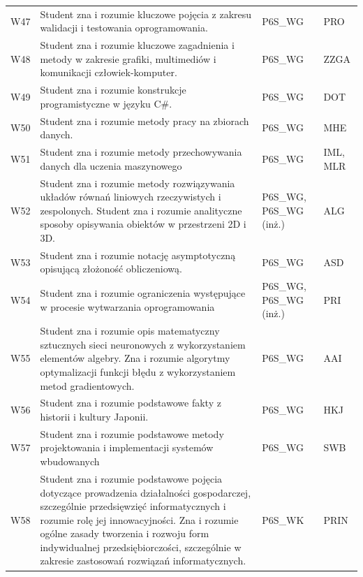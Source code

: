 \documentclass[12pt,a4paper]{article}
\begin{document}
{\begin{longtable}{m{1cm}m{8.8cm}m{2.1cm}m{2.5cm}}
\rowcolor{tableRowLight} W47 & Student zna i rozumie kluczowe pojęcia z zakresu walidacji i testowania oprogramowania. & {\scriptsize P6S\_WG} & {\scriptsize PRO} \\
\rowcolor{tableRowAlt} W48 & Student zna i rozumie kluczowe zagadnienia i metody w zakresie grafiki, multimediów i komunikacji człowiek-komputer. & {\scriptsize P6S\_WG} & {\scriptsize ZZGA} \\
\rowcolor{tableRowLight} W49 & Student zna i rozumie konstrukcje programistyczne w języku C\#. & {\scriptsize P6S\_WG} & {\scriptsize DOT} \\
\rowcolor{tableRowAlt} W50 & Student zna i rozumie metody pracy na zbiorach danych. & {\scriptsize P6S\_WG} & {\scriptsize MHE} \\
\rowcolor{tableRowLight} W51 & Student zna i rozumie metody przechowywania danych dla uczenia maszynowego & {\scriptsize P6S\_WG} & {\scriptsize IML, MLR} \\
\rowcolor{tableRowAlt} W52 & Student zna i rozumie metody rozwiązywania układów równań liniowych rzeczywistych i zespolonych. Student zna i rozumie analityczne sposoby opisywania obiektów w przestrzeni 2D i 3D. & {\scriptsize P6S\_WG, P6S\_WG {\scriptsize (inż.)}} & {\scriptsize ALG} \\
\rowcolor{tableRowLight} W53 & Student zna i rozumie notację asymptotyczną opisującą złożoność obliczeniową. & {\scriptsize P6S\_WG} & {\scriptsize ASD} \\
\rowcolor{tableRowAlt} W54 & Student zna i rozumie ograniczenia występujące w procesie wytwarzania oprogramowania & {\scriptsize P6S\_WG, P6S\_WG {\scriptsize (inż.)}} & {\scriptsize PRI} \\
\rowcolor{tableRowLight} W55 & Student zna i rozumie opis matematyczny sztucznych sieci neuronowych z wykorzystaniem elementów algebry. Zna i rozumie algorytmy optymalizacji funkcji błędu z wykorzystaniem metod gradientowych. & {\scriptsize P6S\_WG} & {\scriptsize AAI} \\
\rowcolor{tableRowAlt} W56 & Student zna i rozumie podstawowe fakty z historii i kultury Japonii. & {\scriptsize P6S\_WG} & {\scriptsize HKJ} \\
\rowcolor{tableRowLight} W57 & Student zna i rozumie podstawowe metody projektowania i implementacji systemów wbudowanych & {\scriptsize P6S\_WG} & {\scriptsize SWB} \\
\rowcolor{tableRowAlt} W58 & Student zna i rozumie podstawowe pojęcia dotyczące prowadzenia działalności gospodarczej, szczególnie przedsięwzięć informatycznych i rozumie rolę jej innowacyjności. Zna i rozumie ogólne zasady tworzenia i rozwoju form indywidualnej przedsiębiorczości, szczególnie w zakresie zastosowań rozwiązań informatycznych. & {\scriptsize P6S\_WK} & {\scriptsize PRIN} \\

\end{longtable}}
\end{document}
